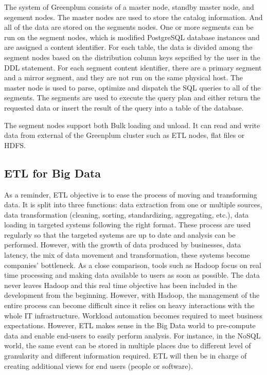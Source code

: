 \documentclass[	DIV=calc,%
							paper=a4,%
							fontsize=11pt,%
							twocolumn]{scrartcl}	 					%
\begin{document}
The system of Greenplum consists of a master node, standby master node, and segement nodes.  The master nodes are used to store the catalog information. And all of the data are stored on the segments nodes. One or more segments can be run on the segment nodes, which is modified PostgreSQL database instances and are assigned a content identifier. For each table, the data is divided among the segment nodes based on the distribution column keys sepcified by the user in the DDL statement. For each segment content identifier, there are a primary segment and a mirror segment, and they are not run on the same physical host.  The master node is used to parse, optimize and dispatch the SQL queries to all of the segments. The segments are used to execute the query plan and either return the requested data or insert the result of the query into a table of the database.

The segment nodes support both Bulk loading and unload. It can read and write data from external of the Greenplum cluster such as ETL nodes, flat files or HDFS. 




\subsection*{ETL for Big Data}
As a reminder, ETL objective is to ease the process of moving and transforming data. It is split into three functions: data extraction from one or multiple sources, data transformation (cleaning, sorting, standardizing, aggregating, etc.), data loading in targeted systems following the right format. These process are used regularly so that the targeted systems are up to date and analysis can be performed. However, with the growth of data produced by businesses, data latency, the mix of data movement and transformation, these systems become companies’ bottleneck.
As a close comparison, tools such as Hadoop focus on real time processing and making data available to users as soon as possible. The data never leaves Hadoop and this real time objective has been included in the development from the beginning. However, with Hadoop, the management of the entire process can become difficult since it relies on heavy interactions with the whole IT infrastructure. Workload automation becomes required to meet business expectations.
However, ETL makes sense in the Big Data world to pre-compute data and enable end-users to easily perform analysis. For instance, in the NoSQL world, the same event can be stored in multiple places due to different level of granularity and different information required. ETL will then be in charge of creating additional views for end users (people or software).
\end{document}

